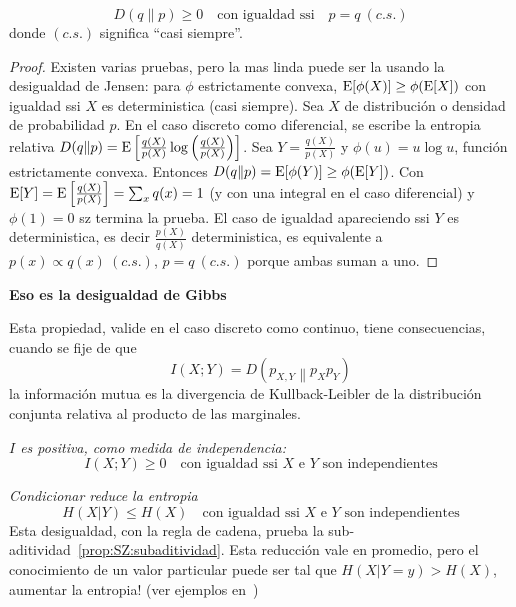 \begin{lema}
  \[
  D(q\|p) \ge 0 \quad \mbox{con igualdad ssi} \quad p = q \: (c.s.)
  \]
  donde $(c.s.)$ significa ``casi siempre''.
\end{lema}
%
\begin{proof}
  Existen varias pruebas,  pero la mas linda puede ser  la usando la desigualdad
  de   Jensen:   para   $\phi$   estrictamente   convexa,   $\operatorname{E}[\phi(X)]   \ge
  \phi(\operatorname{E}[X])$ con igualdad ssi $X$  es deterministica (casi siempre). Sea $X$
  de distribuci\'on  o densidad  de probabilidad $p$.  En el caso  discreto como
  diferencial,   se  escribe   la  entropia   relativa  $D(q\|p)   =  \operatorname{E}\left[
    \frac{q(X)}{p(X)} \log  \left( \frac{q(X)}{p(X)} \right) \right]$.  Sea $Y =
  \frac{q(X)}{p(X)}$   y  $\phi(u)   =  u   \log  u$,   funci\'on  estrictamente
  convexa. Entonces $D(q\|p) =  \operatorname{E}[\phi(Y)] \ge \phi(\operatorname{E}[Y])$. Con $\operatorname{E}[Y] =
  \operatorname{E}\left[ \frac{q(X)}{p(X)} \right] = \sum_x q(x) = 1$ (y con una integral en
  el caso diferencial) y $\phi(1) = 0$ sz termina la prueba. El caso de igualdad
  apareciendo   ssi  $Y$   es  deterministica,   es   decir  $\frac{p(X)}{q(X)}$
  deterministica, es equivalente a $p(x) \propto  q(x) \: (c.s.)$, \ie $p = q \:
  (c.s.)$ porque ambas suman a uno.
\end{proof}


{\bf\color{red} Eso es la desigualdad de Gibbs}

Esta propiedad, valide  en el caso discreto como  continuo, tiene consecuencias,
cuando  se fije  de que
%
\[
I(X;Y) = D \left( \left. p_{X,Y} \right\| p_X p_Y \right)
\]
%
\ie  la  informaci\'on  mutua  es  la  divergencia  de  Kullback-Leibler  de  la
distribuci\'on conjunta relativa al producto de las marginales.
%
\begin{propiedades}
\item\label{prop:SZ:Ipositive}   {\it   $I$   es   positiva,  como   medida   de
    independencia:}
  \[
  I(X;Y) \ge 0 \quad \mbox{con igualdad ssi $X$ e $Y$ son independientes}
  \]
%
\item\label{prop:SZ:condicionar} {\it  Condicionar reduce la  entropia}
  \[
  H(X|Y) \le H(X) \quad \mbox{con igualdad ssi $X$ e $Y$ son independientes}
  \]
  Esta    desigualdad,     con    la     regla    de    cadena,     prueba    la
  sub-aditividad~\ref{prop:SZ:subaditividad}.    Esta    reducci\'on   vale   en
  promedio, pero el conocimiento de un valor particular puede ser tal que $H(X|Y
  = y) > H(X)$, \ie aumentar la entropia!  (ver ejemplos en~\cite[p.~59]{Rio07})
\end{propiedades}

